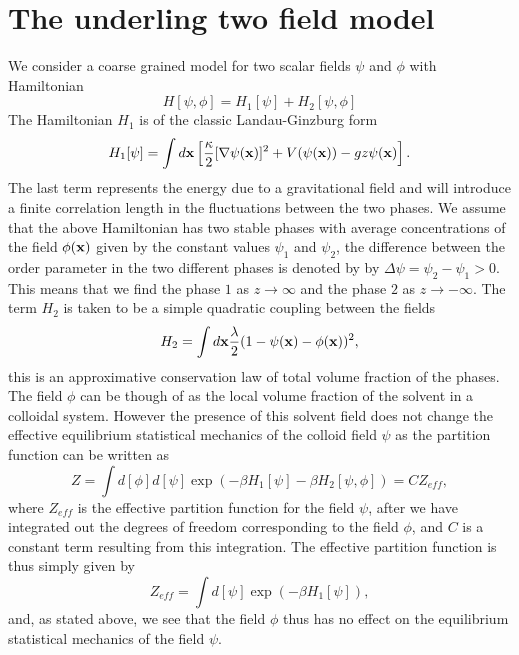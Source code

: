 \section{The underling two field  model}
We consider a coarse grained model for two scalar fields $\psi$ and $\phi$ with Hamiltonian
\begin{equation}
H[\psi,\phi] = H_1[\psi] +H_2[\psi,\phi]
\end{equation}
The Hamiltonian $H_1$ is of the classic Landau-Ginzburg form
\begin{equation}
H_1[\psi]=\int d{\bf x}\left[\frac{\kappa}{2}[\nabla\psi({\bf x})]^2 + V(\psi({\bf x}))
- gz \psi({\bf x})\right].
\end{equation}
The last term represents the energy due to a gravitational field and will introduce a finite correlation length in the fluctuations between the two phases. We assume that the above Hamiltonian has two stable phases with average concentrations of the field $\phi({\bf x})$ given by the constant values $\psi_1$ and $\psi_2$, the difference between the order parameter in  the two different phases is denoted by 
by $\Delta\psi= \psi_2 -\psi_1>0$. This means that we find the phase $1$ as $z\to\infty$ and the phase $2$ as $z\to-\infty$. The term $H_2$ is taken to be a simple quadratic coupling between the fields
\begin{equation}
H_2 =\int d{\bf x} \frac{\lambda}{2}(1-\psi({\bf x})-\phi({\bf x}))^2,
\end{equation}
this is an approximative conservation law of total volume fraction of the phases. The field $\phi$ can be though of as the local volume fraction of the solvent in a colloidal system. However the presence of this solvent field does not change the effective equilibrium statistical mechanics of the colloid field $\psi$ as the partition function can be written as 
\begin{equation}
Z = \int d[\phi]d[\psi]\exp(-\beta H_1[\psi]- \beta H_2[\psi,\phi]) = CZ_{eff},
\end{equation}
where $Z_{eff}$ is the effective partition function for the field $\psi$, after we have integrated out the degrees of freedom corresponding to the field $\phi$,
and $C$ is a constant term resulting from this integration. The effective partition function is thus simply given by
\begin{equation}
Z_{eff} = \int d[\psi]\exp(-\beta H_1[\psi]),
\end{equation}
and, as stated above, we see that the field $\phi$ thus has no effect on the equilibrium statistical mechanics of the field $\psi$.

